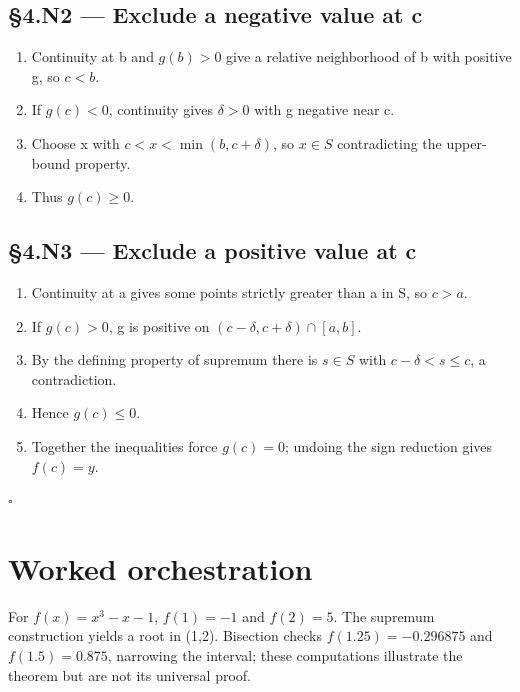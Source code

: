 \documentclass[preprint,12pt,aps,pra,showkeys,amsmath,amssymb,superscriptaddress,floatfix]{revtex4-2}
\theoremstyle{definition}
\theoremstyle{remark}
\begin{document}
\subsection{§4.N2 --- Exclude a negative value at
c}\label{n2-exclude-a-negative-value-at-c}

\begin{enumerate}
\def\labelenumi{\arabic{enumi}.}
\item
  Continuity at b and \(g(b)>0\) give a relative neighborhood of b with
  positive g, so \(c<b\).
\item
  If \(g(c)<0\), continuity gives \(\delta >0\) with g negative near c.
\item
  Choose x with \(c<x<\operatorname{min} (b,c+\delta )\), so \(x\in S\)
  contradicting the upper-bound property.
\item
  Thus \(g(c)\ge 0\).
\end{enumerate}

\subsection{§4.N3 --- Exclude a positive value at
c}\label{n3-exclude-a-positive-value-at-c}

\begin{enumerate}
\def\labelenumi{\arabic{enumi}.}
\item
  Continuity at a gives some points strictly greater than a in S, so
  \(c>a\).
\item
  If \(g(c)>0\), g is positive on \((c-\delta ,c+\delta )\cap [a,b]\).
\item
  By the defining property of supremum there is \(s\in S\) with
  \(c-\delta <s\le c\), a contradiction.
\item
  Hence \(g(c)\le 0\).
\item
  Together the inequalities force \(g(c)=0\); undoing the sign reduction
  gives \(f(c)=y\).
\end{enumerate}

\hfill$\square$

\section{Worked orchestration}

For \(f(x)=x^{3}-x-1\), \(f(1)=-1\) and \(f(2)=5\). The supremum
construction yields a root in (1,2). Bisection checks
\(f(1.25)=-0.296875\) and \(f(1.5)=0.875\), narrowing the interval;
these computations illustrate the theorem but are not its universal
proof.
\end{document}
